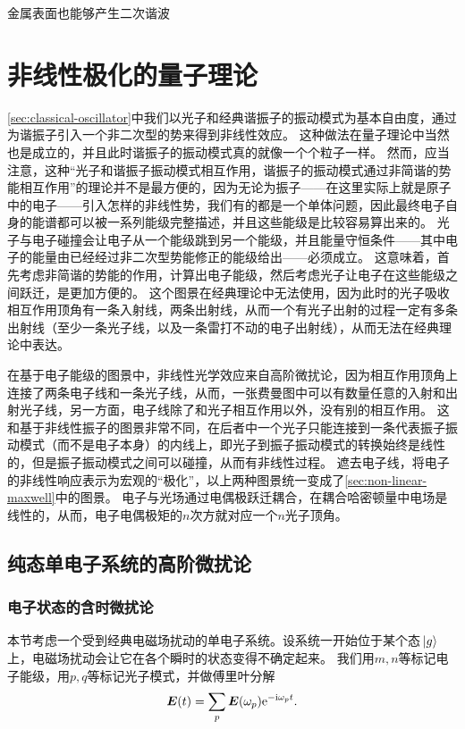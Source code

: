 金属表面也能够产生二次谐波

\section{非线性极化的量子理论}

\autoref{sec:classical-oscillator}中我们以光子和经典谐振子的振动模式为基本自由度，通过为谐振子引入一个非二次型的势来得到非线性效应。
这种做法在量子理论中当然也是成立的，并且此时谐振子的振动模式真的就像一个个粒子一样。
然而，应当注意，这种“光子和谐振子振动模式相互作用，谐振子的振动模式通过非简谐的势能相互作用”的理论并不是最方便的，因为无论为振子——在这里实际上就是原子中的电子——引入怎样的非线性势，我们有的都是一个单体问题，因此最终电子自身的能谱都可以被一系列能级完整描述，并且这些能级是比较容易算出来的。
光子与电子碰撞会让电子从一个能级跳到另一个能级，并且能量守恒条件——其中电子的能量由已经经过非二次型势能修正的能级给出——必须成立。
这意味着，首先考虑非简谐的势能的作用，计算出电子能级，然后考虑光子让电子在这些能级之间跃迁，是更加方便的。
这个图景在经典理论中无法使用，因为此时的光子吸收相互作用顶角有一条入射线，两条出射线，从而一个有光子出射的过程一定有多条出射线（至少一条光子线，以及一条雷打不动的电子出射线），从而无法在经典理论中表达。

在基于电子能级的图景中，非线性光学效应来自高阶微扰论，因为相互作用顶角上连接了两条电子线和一条光子线，从而，一张费曼图中可以有数量任意的入射和出射光子线，另一方面，电子线除了和光子相互作用以外，没有别的相互作用。
这和基于非线性振子的图景非常不同，在后者中一个光子只能连接到一条代表振子振动模式（而不是电子本身）的内线上，即光子到振子振动模式的转换始终是线性的，但是振子振动模式之间可以碰撞，从而有非线性过程。
遮去电子线，将电子的非线性响应表示为宏观的“极化”，以上两种图景统一变成了\autoref{sec:non-linear-maxwell}中的图景。
电子与光场通过电偶极跃迁耦合，在耦合哈密顿量中电场是线性的，从而，电子电偶极矩的$n$次方就对应一个$n$光子顶角。

\subsection{纯态单电子系统的高阶微扰论}

\subsubsection{电子状态的含时微扰论}

本节考虑一个受到经典电磁场扰动的单电子系统。设系统一开始位于某个态$\ket*{g}$上，电磁场扰动会让它在各个瞬时的状态变得不确定起来。
我们用$m, n$等标记电子能级，用$p, q$等标记光子模式，并做傅里叶分解
\begin{equation}
    \vb*{E}(t) = \sum_p \vb*{E}(\omega_p) \mathrm{e}^{- \mathrm{i} \omega_p t}.
\end{equation}

